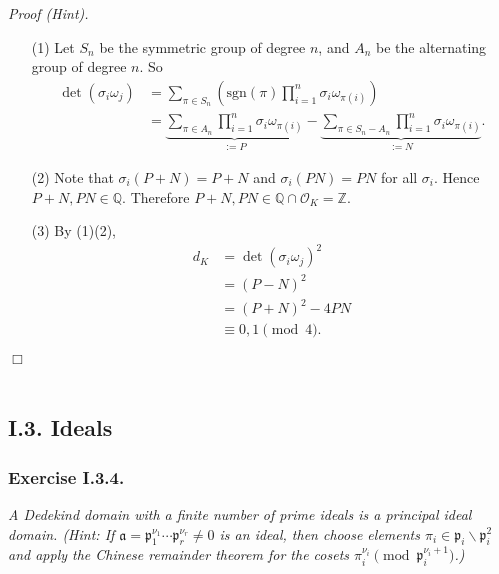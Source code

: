 \documentclass{article}
\begin{document}
\emph{Proof (Hint).}
\begin{enumerate}
\item[(1)]
  Let $S_n$ be the symmetric group of degree $n$, and
  $A_n$ be the alternating group of degree $n$.
  So
  \begin{align*}
    \det(\sigma_i \omega_j)
    &= \sum_{\pi \in S_n}
      \left( \mathrm{sgn}(\pi) \prod_{i=1}^{n} \sigma_i \omega_{\pi(i)} \right) \\
    &= \underbrace{\sum_{\pi \in A_n} \prod_{i=1}^{n} \sigma_i \omega_{\pi(i)}}_{:= P}
      - \underbrace{\sum_{\pi \in S_n - A_n} \prod_{i=1}^{n} \sigma_i \omega_{\pi(i)}}_{:= N}.
  \end{align*}

\item[(2)]
  Note that $\sigma_i(P+N) = P+N$ and $\sigma_i(PN) = PN$ for all $\sigma_i$.
  Hence $P+N, PN \in \mathbb{Q}$.
  Therefore $P+N, PN \in \mathbb{Q} \cap \mathcal{O}_K = \mathbb{Z}$.

\item[(3)]
  By (1)(2),
  \begin{align*}
    d_K
    &= \det(\sigma_i \omega_j)^2 \\
    &= (P-N)^2 \\
    &= (P+N)^2 - 4PN \\
    &\equiv 0, 1 \pmod 4.
  \end{align*}
\end{enumerate}
$\Box$ \\\\









\subsection*{I.3. Ideals \\}



\subsubsection*{Exercise I.3.4.}
\emph{A Dedekind domain with a finite number of prime ideals is a principal ideal domain.
(Hint: If $\mathfrak{a} = \mathfrak{p}_{1}^{\nu_1} \cdots \mathfrak{p}_{r}^{\nu_r} \neq 0$
is an ideal, then choose elements
$\pi_i \in \mathfrak{p}_{i} \smallsetminus \mathfrak{p}_{i}^2$
and apply the Chinese remainder theorem for the cosets
$\pi_i^{\nu_i} \pmod{\mathfrak{p}_{i}^{\nu_i+1}}$.)} \\
\end{document}
